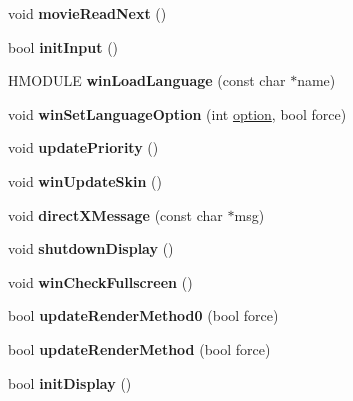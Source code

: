 \begin{DoxyCompactItemize}
void {\bfseries movie\+Read\+Next} ()
\item 
\mbox{\label{class_v_b_a_ac19c75e259950ddd9bb5e97d73203ebb}} 
bool {\bfseries init\+Input} ()
\item 
\mbox{\label{class_v_b_a_abbf1f3cbda50fca40ddf50a6fafe8e05}} 
H\+M\+O\+D\+U\+LE {\bfseries win\+Load\+Language} (const char $\ast$name)
\item 
\mbox{\label{class_v_b_a_ae872998a3ecf3ec0d504378744f441e6}} 
void {\bfseries win\+Set\+Language\+Option} (int \mbox{\hyperlink{structoption}{option}}, bool force)
\item 
\mbox{\label{class_v_b_a_a82623f5ce8199b90e3a68fe8c8fee853}} 
void {\bfseries update\+Priority} ()
\item 
\mbox{\label{class_v_b_a_a4648998e25679df69b15afdccb428b8f}} 
void {\bfseries win\+Update\+Skin} ()
\item 
\mbox{\label{class_v_b_a_acb1288f72a2122817f05df2da91a67d2}} 
void {\bfseries direct\+X\+Message} (const char $\ast$msg)
\item 
\mbox{\label{class_v_b_a_ac71d70eba3bf4229255b6aeeea9573e5}} 
void {\bfseries shutdown\+Display} ()
\item 
\mbox{\label{class_v_b_a_a340eaeeb7fcfc242f08ac3442d991a96}} 
void {\bfseries win\+Check\+Fullscreen} ()
\item 
\mbox{\label{class_v_b_a_a0db47ba257f450e098e7079199385b70}} 
bool {\bfseries update\+Render\+Method0} (bool force)
\item 
\mbox{\label{class_v_b_a_a1d5b9c4597d5c565ce4d8ba1e594a89f}} 
bool {\bfseries update\+Render\+Method} (bool force)
\item 
\mbox{\label{class_v_b_a_a641fd39cdf7ab5f8eff2f85f3ecf3260}} 
bool {\bfseries init\+Display} ()
\item 
\mbox{\label{class_v_b_a_ac278ece4958310ce2ef8751afbad08f3}} 

\end{DoxyCompactItemize}
